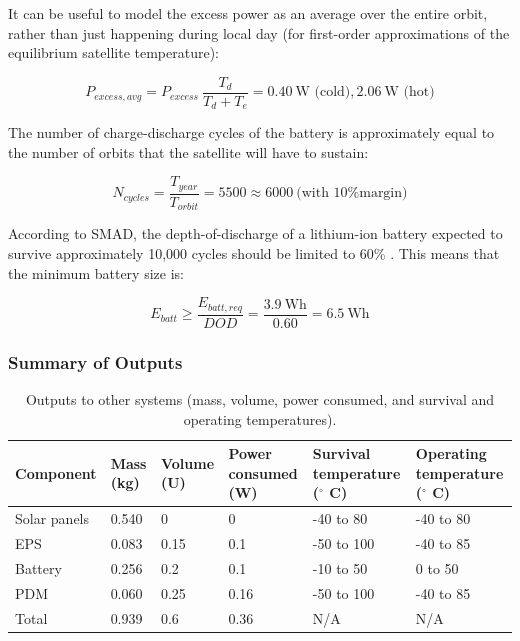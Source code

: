 \documentclass[12pt]{article}
\begin{document}
It can be useful to model the excess power as an average over the entire orbit, rather than just happening during local day (for first-order approximations of the equilibrium satellite temperature):

\begin{equation}
P_{excess,avg} = P_{excess} \: \frac{T_d}{T_d + T_e} = 0.40 \ \text{W (cold)}, 2.06 \ \text{W (hot)}
\label{eq:power-excess-avg}
\end{equation}

The number of charge-discharge cycles of the battery is approximately equal to the number of orbits that the satellite will have to sustain:

\begin{equation}
N_{cycles} = \frac{T_{year}}{T_{orbit}} = 5500 \approx 6000 \ \text{(with 10\% margin)}
\label{eq:power-num-cycles}
\end{equation}

According to SMAD, the depth-of-discharge of a lithium-ion battery expected to survive approximately 10,000 cycles should be limited to 60\% \cite[p.~651,~Fig.~21-16]{SMAD}.  This means that the minimum battery size is:

\begin{equation}
E_{batt} \geq \frac{E_{batt,req}}{DOD} = \frac{3.9 \ \text{Wh}}{0.60} = 6.5 \ \text{Wh}
\label{eq:power-batt-size}
\end{equation}

			\subsubsection{Summary of Outputs}
			
			

\begin{table}[ht]
\caption{Outputs to other systems (mass, volume, power consumed, and survival and operating temperatures).\cite[p.~9]{EPS-manual}\cite[p.~11,~21]{PDM-manual}\cite[p.~9]{Battery-manual}\cite[p.~2]{Solar-panel-datasheet}}
\label{tab:power-outputs}
\begin{center}
    \begin{tabular}{|l|l|l|p{0.8in}|p{1in}|p{1.1in}|} \hline
Component & Mass (kg) & Volume (U) & Power consumed (W) & Survival temperature ($^\circ$ C) & Operating temperature ($^\circ$ C) \\ \hline \hline
Solar panels & 0.540 & 0 & 0 & -40 to 80 & -40 to 80 \\\hline
EPS & 0.083 & 0.15 & 0.1 & -50 to 100 & -40 to 85 \\\hline
Battery & 0.256 & 0.2 & 0.1 & -10 to 50 & 0 to 50 \\\hline
PDM & 0.060 & 0.25 & 0.16 & -50 to 100 & -40 to 85 \\\hline \hline
Total & 0.939 & 0.6 & 0.36 & N/A & N/A \\\hline
    \end{tabular}
\end{center}
\end{table}
\end{document}
